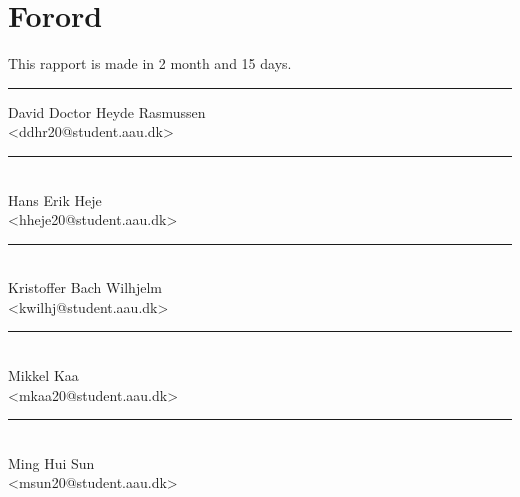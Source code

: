 \section*{Forord}%

This rapport is made in 2 month and 15 days.

\vfill\noindent

\begin{center}
\begin{minipage}[b]{0.45\textwidth}
 \centering
 \rule{\textwidth}{0.5pt}
  David Doctor Heyde Rasmussen\\
 {\footnotesize <ddhr20@student.aau.dk>}
\end{minipage}
\end{center}

\begin{center}
\begin{minipage}[b]{0.45\textwidth}
 \centering
 \rule{\textwidth}{0.5pt}\\
  Hans Erik Heje\\
 {\footnotesize <hheje20@student.aau.dk>}
\end{minipage}
\hfill
\begin{minipage}[b]{0.45\textwidth}
 \centering
 \rule{\textwidth}{0.5pt}\\
  Kristoffer Bach Wilhjelm\\
 {\footnotesize <kwilhj@student.aau.dk>}
\end{minipage}
\vspace{3\baselineskip}
\end{center}

\begin{center}
\begin{minipage}[b]{0.45\textwidth}
 \centering
 \rule{\textwidth}{0.5pt}\\
  Mikkel Kaa\\
 {\footnotesize <mkaa20@student.aau.dk>}
\end{minipage}
\hfill
\begin{minipage}[b]{0.45\textwidth}
 \centering
 \rule{\textwidth}{0.5pt}\\
  Ming Hui Sun\\
 {\footnotesize <msun20@student.aau.dk>}
\end{minipage}
\end{center}
